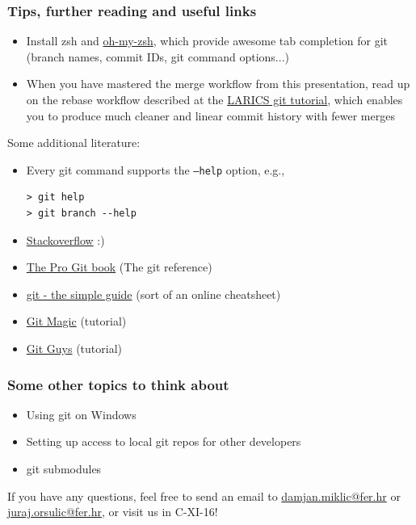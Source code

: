 \documentclass[xcolor=dvipsnames]{beamer}%
\begin{document}
\begin{frame}[fragile]

\frametitle{Tips, further reading and useful links}

	\begin{itemize}	
	\item Install zsh and \href{http://ohmyz.sh/}{oh-my-zsh}, which provide awesome tab completion for git (branch names, commit IDs, git command options...)
	\item When you have mastered the merge workflow from this presentation, read up on the rebase workflow described at the \href{http://larics.fer.hr/farm/laricswiki/doku.php?id=software:git}{LARICS git tutorial}, which enables you to produce much cleaner and linear commit history with fewer merges
	\end{itemize}
	
Some additional literature:
	\begin{itemize}
	\item Every git command supports the \texttt{--help} option, e.g.,
	\begin{verbatim}
> git help
> git branch --help
	\end{verbatim}
	\item \href{http://stackoverflow.com/questions/tagged/git}{Stackoverflow} :)
	\item \href{https://git-scm.com/book/en/v2}{The Pro Git book} (The git reference)
	\item \href{http://rogerdudler.github.io/git-guide/}{git - the simple guide} (sort of an online cheatsheet)
	\item \href{http://www-cs-students.stanford.edu/~blynn/gitmagic/}{Git Magic} (tutorial) 
	\item \href{http://www.gitguys.com/}{Git Guys} (tutorial)
	\end{itemize}
	
\end{frame}


\begin{frame}
	\frametitle{Some other topics to think about}
	
	\begin{itemize}
		\item Using git on Windows
		\item Setting up access to local git repos for other developers
		\item git submodules
	\end{itemize}

	If you have any questions, feel free to send an email to 
	\href{mailto:damjan.miklic@fer.hr}{damjan.miklic@fer.hr} or
	\href{mailto:juraj.orsulic@fer.hr}{juraj.orsulic@fer.hr}, or visit us in C-XI-16!
	
\end{frame}

\end{document}
